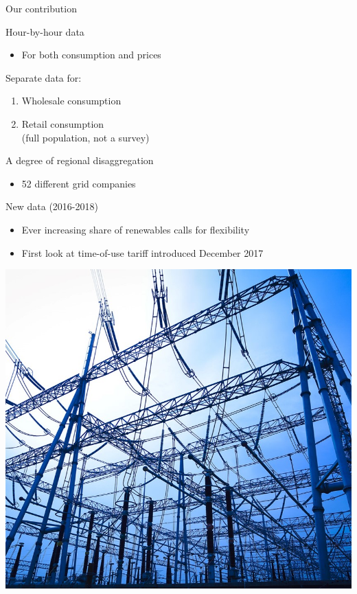 \begin{frame}{Our contribution}
\begin{multicols}{2}
Hour-by-hour data
\begin{itemize}
    \item For both consumption and prices
\end{itemize}
Separate data for:
\begin{enumerate}
    \item Wholesale consumption
    \item Retail consumption\\
          (full population, not a survey)
\end{enumerate}
A degree of regional disaggregation
\begin{itemize}
    \item 52 different grid companies
\end{itemize}
New data (2016-2018)
\begin{itemize}
    \item Ever increasing share of renewables calls for flexibility
    \item First look at time-of-use tariff introduced December 2017
\end{itemize}
\includegraphics[width=0.6 \textwidth]{graphics/transformer}
\end{multicols}
\end{frame}


